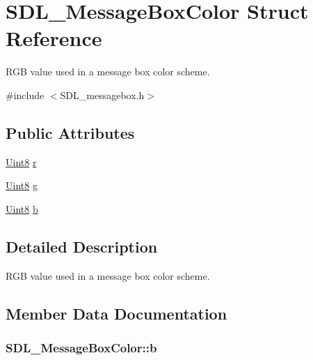 \hypertarget{struct_s_d_l___message_box_color}{}\section{S\+D\+L\+\_\+\+Message\+Box\+Color Struct Reference}
\label{struct_s_d_l___message_box_color}


R\+GB value used in a message box color scheme.  




{\ttfamily \#include $<$S\+D\+L\+\_\+messagebox.\+h$>$}

\subsection*{Public Attributes}
\begin{DoxyCompactItemize}
\item 
\hyperlink{_s_d_l__stdinc_8h_a2944638813a090aa23e62f4da842c3e2}{Uint8} \hyperlink{struct_s_d_l___message_box_color_a43ab2172c10058380fcf67ecc3f53184}{r}
\item 
\hyperlink{_s_d_l__stdinc_8h_a2944638813a090aa23e62f4da842c3e2}{Uint8} \hyperlink{struct_s_d_l___message_box_color_a5820adab0b32aa3eade101ea36ed6b4a}{g}
\item 
\hyperlink{_s_d_l__stdinc_8h_a2944638813a090aa23e62f4da842c3e2}{Uint8} \hyperlink{struct_s_d_l___message_box_color_ad1215a42167cb5b190ff8f19dbd42066}{b}
\end{DoxyCompactItemize}


\subsection{Detailed Description}
R\+GB value used in a message box color scheme. 

\subsection{Member Data Documentation}
\subsubsection[{\texorpdfstring{b}{b}}]{ S\+D\+L\+\_\+\+Message\+Box\+Color\+::b}\hypertarget{struct_s_d_l___message_box_color_ad1215a42167cb5b190ff8f19dbd42066}{}\label{struct_s_d_l___message_box_color_ad1215a42167cb5b190ff8f19dbd42066}
